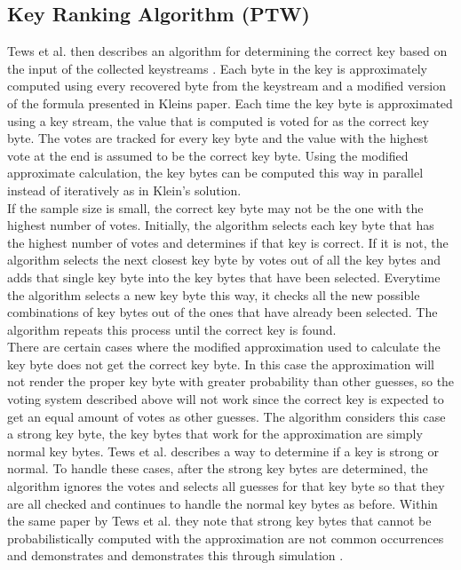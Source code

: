 \documentclass[10pt, titlepage]{article}
\begin{document}
\subsection{Key Ranking Algorithm (PTW)}
Tews et al. then describes an algorithm for determining the correct key based on the input of the collected keystreams \cite{mainPaper}. Each byte in the key is approximately computed using every recovered byte from the keystream and a modified version of the formula presented in Kleins paper. Each time the key byte is approximated using a key stream, the value that is computed is voted for as the correct key byte. The votes are tracked for every key byte and the value with the highest vote at the end is assumed to be the correct key byte. Using the modified approximate calculation, the key bytes can be computed this way in parallel instead of iteratively as in Klein's solution.\\

If the sample size is small, the correct key byte may not be the one with the highest number of votes. Initially, the algorithm selects each key byte that has the highest number of votes and determines if that key is correct. If it is not, the algorithm selects the next closest key byte by votes out of all the key bytes and adds that single key byte into the key bytes that have been selected. Everytime the algorithm selects a new key byte this way, it checks all the new possible combinations of key bytes out of the ones that have already been selected. The algorithm repeats this process until the correct key is found. \\

There are certain cases where the modified approximation used to calculate the key byte does not get the correct key byte. In this case the approximation will not render the proper key byte with greater probability than other guesses, so the voting system described above will not work since the correct key is expected to get an equal amount of votes as other guesses. The algorithm considers this case a strong key byte, the key bytes that work for the approximation are simply normal key bytes. Tews et al. describes a way to determine if a key is strong or normal. To handle these cases, after the strong key bytes are determined, the algorithm ignores the votes and selects all guesses for that key byte so that they are all checked and continues to handle the normal key bytes as before. Within the same paper by Tews et al. they note that strong key bytes that cannot be probabilistically computed with the approximation are not common occurrences and demonstrates and demonstrates this through simulation \cite{mainPaper}.\\
\end{document}

